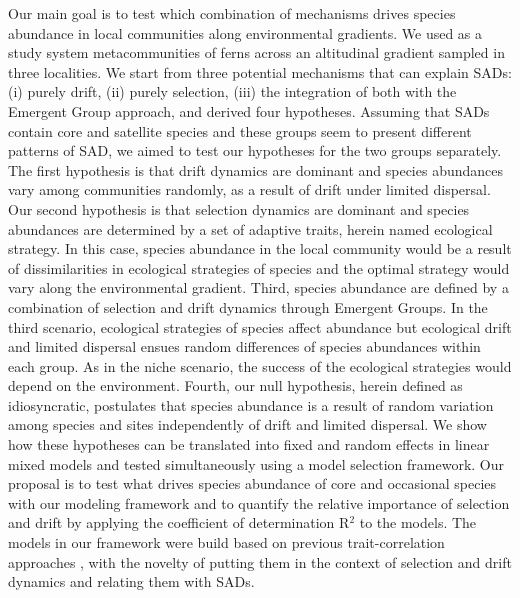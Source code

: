 \documentclass[12pt]{article}
\begin{document}
Our main goal is to test which combination of mechanisms drives species abundance in local communities along environmental gradients. We used as a study system metacommunities of ferns across an altitudinal gradient sampled in three localities. 
We start from three potential mechanisms that can explain SADs: (i) purely drift,  (ii) purely selection, (iii) the integration of both with the Emergent Group approach, and derived four hypotheses. %
Assuming
that SADs contain core and satellite species and these groups seem to present different patterns of SAD, we aimed to test our hypotheses for the two groups separately. 
The first hypothesis is that drift dynamics are dominant and species abundances vary among communities
randomly, as a result of drift under limited dispersal.
Our second hypothesis is that selection dynamics are dominant and species abundances are determined by a set of adaptive traits, herein named ecological strategy. 
In this case, species abundance in the local community would be a result of dissimilarities in ecological strategies of species and the optimal strategy would vary along the environmental gradient. 
Third, species abundance are defined by a combination of selection and drift dynamics through Emergent Groups. In the third scenario, ecological strategies of species affect abundance but ecological drift and limited dispersal ensues random differences of species abundances within each group. As in the niche scenario, the success of the ecological strategies would depend on the environment.
Fourth, our null hypothesis, herein defined as idiosyncratic, postulates that species abundance is a result of random variation among species and sites independently of drift and limited dispersal.
We show how these hypotheses can be translated into fixed and random effects in linear mixed models and tested simultaneously using a model selection framework.
Our proposal is to test what drives species abundance of core and occasional species with our modeling framework and to quantify the relative importance of selection and drift by applying the coefficient of determination R{$^2$} \citep{Nakagawa2013, Nakagawa2017} to the models. The models in our framework were build based on previous trait-correlation approaches \citep{Pollock2012, Jamil2013, Jamil2013a, Miller2019, TerBraak2019}, with the novelty of putting them in the context of selection and drift dynamics and relating them with SADs.
\end{document}
